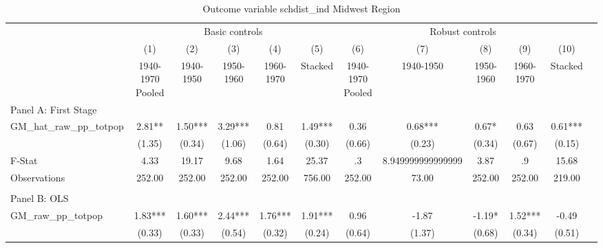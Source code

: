  \begin{table}[htbp]\centering {} \begin{threeparttable} \caption{Outcome variable schdist\_ind Midwest Region} \begin{tabular}{l*{11}{c}} \toprule
          &\multicolumn{5}{c}{Basic controls}                                   &\multicolumn{5}{c}{Robust controls}                                  \\\cmidrule(lr){2-6}\cmidrule(lr){7-11}
          &\multicolumn{1}{c}{(1)}&\multicolumn{1}{c}{(2)}&\multicolumn{1}{c}{(3)}&\multicolumn{1}{c}{(4)}&\multicolumn{1}{c}{(5)}&\multicolumn{1}{c}{(6)}&\multicolumn{1}{c}{(7)}&\multicolumn{1}{c}{(8)}&\multicolumn{1}{c}{(9)}&\multicolumn{1}{c}{(10)}\\
          &\multicolumn{1}{c}{1940-1970 Pooled}&\multicolumn{1}{c}{1940-1950}&\multicolumn{1}{c}{1950-1960}&\multicolumn{1}{c}{1960-1970}&\multicolumn{1}{c}{Stacked}&\multicolumn{1}{c}{1940-1970 Pooled}&\multicolumn{1}{c}{1940-1950}&\multicolumn{1}{c}{1950-1960}&\multicolumn{1}{c}{1960-1970}&\multicolumn{1}{c}{Stacked}\\
\cmidrule(lr){1-11}
\multicolumn{10}{l}{Panel A: First Stage}\\
\cmidrule(lr){1-11}
GM\_hat\_raw\_pp\_totpop&      2.81** &      1.50***&      3.29***&      0.81   &      1.49***&      0.36   &      0.68***&      0.67*  &      0.63   &      0.61***\\
          &    (1.35)   &    (0.34)   &    (1.06)   &    (0.64)   &    (0.30)   &    (0.66)   &    (0.23)   &    (0.34)   &    (0.67)   &    (0.15)   \\
\midrule
F-Stat    &      4.33   &     19.17   &      9.68   &      1.64   &     25.37   &        .3   &8.949999999999999   &      3.87   &        .9   &     15.68   \\
Observations&    252.00   &    252.00   &    252.00   &    252.00   &    756.00   &    252.00   &     73.00   &    252.00   &    252.00   &    219.00   \\
\cmidrule[\heavyrulewidth](lr){1-11} \\ \cmidrule[\heavyrulewidth](lr){1-11}
\multicolumn{10}{l}{Panel B: OLS}\\
\cmidrule(lr){1-11}
GM\_raw\_pp\_totpop&      1.83***&      1.60***&      2.44***&      1.76***&      1.91***&      0.96   &     -1.87   &     -1.19*  &      1.52***&     -0.49   \\
          &    (0.33)   &    (0.33)   &    (0.54)   &    (0.32)   &    (0.24)   &    (0.64)   &    (1.37)   &    (0.68)   &    (0.34)   &    (0.51)   \\

\end{tabular}
\end{threeparttable}
\end{table}

